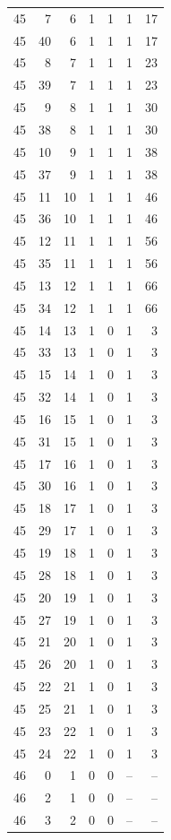 \begin{longtable}{rrrrrrr}
45 & 7 & 6 & 1 & 1 & 1 & 17\\
45 & 40 & 6 & 1 & 1 & 1 & 17\\
45 & 8 & 7 & 1 & 1 & 1 & 23\\
45 & 39 & 7 & 1 & 1 & 1 & 23\\
45 & 9 & 8 & 1 & 1 & 1 & 30\\
45 & 38 & 8 & 1 & 1 & 1 & 30\\
45 & 10 & 9 & 1 & 1 & 1 & 38\\
45 & 37 & 9 & 1 & 1 & 1 & 38\\
45 & 11 & 10 & 1 & 1 & 1 & 46\\
45 & 36 & 10 & 1 & 1 & 1 & 46\\
45 & 12 & 11 & 1 & 1 & 1 & 56\\
45 & 35 & 11 & 1 & 1 & 1 & 56\\
45 & 13 & 12 & 1 & 1 & 1 & 66\\
45 & 34 & 12 & 1 & 1 & 1 & 66\\
45 & 14 & 13 & 1 & 0 & 1 & 3\\
45 & 33 & 13 & 1 & 0 & 1 & 3\\
45 & 15 & 14 & 1 & 0 & 1 & 3\\
45 & 32 & 14 & 1 & 0 & 1 & 3\\
45 & 16 & 15 & 1 & 0 & 1 & 3\\
45 & 31 & 15 & 1 & 0 & 1 & 3\\
45 & 17 & 16 & 1 & 0 & 1 & 3\\
45 & 30 & 16 & 1 & 0 & 1 & 3\\
45 & 18 & 17 & 1 & 0 & 1 & 3\\
45 & 29 & 17 & 1 & 0 & 1 & 3\\
45 & 19 & 18 & 1 & 0 & 1 & 3\\
45 & 28 & 18 & 1 & 0 & 1 & 3\\
45 & 20 & 19 & 1 & 0 & 1 & 3\\
45 & 27 & 19 & 1 & 0 & 1 & 3\\
45 & 21 & 20 & 1 & 0 & 1 & 3\\
45 & 26 & 20 & 1 & 0 & 1 & 3\\
45 & 22 & 21 & 1 & 0 & 1 & 3\\
45 & 25 & 21 & 1 & 0 & 1 & 3\\
45 & 23 & 22 & 1 & 0 & 1 & 3\\
45 & 24 & 22 & 1 & 0 & 1 & 3\\
46 & 0 & 1 & 0 & 0 & -- & --\\
46 & 2 & 1 & 0 & 0 & -- & --\\
46 & 3 & 2 & 0 & 0 & -- & --\\

\end{longtable}
